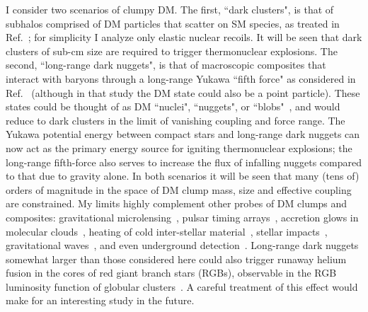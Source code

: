\documentclass[
    twocolumn,
	prd,
        amssymb,
	preprintnumbers,
	secnumarabic,
	nofootinbib,
	superscriptaddress]{revtex4-1}
\begin{document}
I consider two scenarios of clumpy DM.
The first, ``dark clusters", is that of subhalos comprised of DM particles that scatter on SM species, as treated in Ref.~\cite{NSvIR:clumps2021}; for simplicity I analyze only elastic nuclear recoils.
It will be seen that dark clusters of sub-cm size are required to trigger thermonuclear explosions. 
The second, ``long-range dark nuggets", is that of macroscopic composites that interact with baryons through a long-range Yukawa ``fifth force" as considered in Ref.~\cite{GreshamLeeZurek:2022biw} (although in that study the DM state could also be a point particle). 
These states could be thought of as DM ``nuclei", ``nuggets", or ``blobs"~\cite{nuggetsWitten:1984rs,nucleiKrnjaic:2014xza,nucleiDetmoldMcCullough:2014qqa,nucleiHardy:2014mqa,boundstateWise:2014jva,boundstateWise:2014ola,nucleiHardy:2015boa,nucleiGresham:2017zqi,nuggetsGresham:2017cvl,nucleiMcDermott:2017vyk,nuggetsGresham:2018anj,BaiLongLunuggets:2018dxf,BlobsGrabowska:2018lnd}, and would reduce to dark clusters in the limit of vanishing coupling and force range.
The Yukawa potential energy between compact stars and long-range dark nuggets can now act as the primary energy source for igniting thermonuclear explosions; the long-range fifth-force also serves to increase the flux of infalling nuggets compared to that due to gravity alone.
In both scenarios it will be seen that many (tens of) orders of magnitude in the space of DM clump mass, size and effective coupling are constrained.
My limits highly complement other probes of DM clumps and composites:
gravitational microlensing~\cite{ECOlocation1,ECOlocation2}, 
pulsar timing arrays~\cite{PTA:Dror:2019twh,PTALee:2021zqw}, 
accretion glows in molecular clouds~\cite{dMACHOS:Bai:2020jfm},
heating of cold inter-stellar material~\cite{Wadekar:2022ymq},
stellar impacts~\cite{StellarShocksDas2022},
gravitational waves~\cite{Croon:2022tmr},
and even underground detection~\cite{nussinovcluster,DDclumps:WidrowStiff:2001dq,DDclumps:Kamionkowski:2008vw,bradleyclumpSun,xmaslights:Bramante:2018qbc,xmaslights:Bramante:2018tos,BlobsGrabowska:2018lnd,xmaslights:Bramante:2019yss,Acevedo:2020avd,xmaslights:DEAPCollaboration:2021raj,Acevedo:2021kly,snowmass:Carney:2022gse,Jacobs:2014yca,Ebadi:2021cte,Acevedo:2021tbl}.
Long-range dark nuggets somewhat larger than those considered here could also trigger runaway helium fusion in the cores of red giant branch stars (RGBs), observable in the RGB luminosity function of globular clusters~\cite{Dessert:2021wjx}. A careful treatment of this effect would make for an interesting study in the future.
\end{document}
